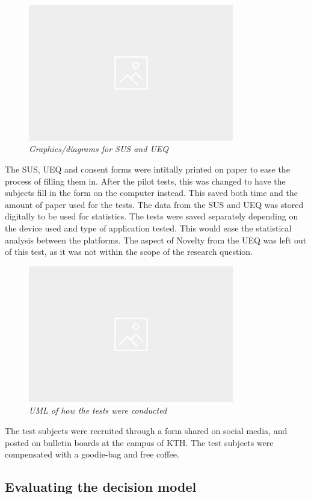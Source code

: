 \begin{figure}[ht!]
	\centering 
    \includegraphics[width=0.8\textwidth]{img/placeholder.png}
	\hfill
	\caption{\textit{ Graphics/diagrams for SUS and UEQ }}
\end{figure}

The SUS, UEQ and consent forms were intitally printed on paper to ease the process of filling them in. After the pilot tests, this was changed to have the subjects fill in the form on the computer instead. This saved both time and the amount of paper used for the tests. The data from the SUS and UEQ was stored digitally to be used for statistics. The tests were saved separately depending on the device used and type of application tested. This would ease the statistical analysis between the platforms. The aspect of Novelty from the UEQ was left out of this test, as it was not within the scope of the research question.

\begin{figure}[ht!]
	\centering 
    \includegraphics[width=0.8\textwidth]{img/placeholder.png}
	\hfill
	\caption{\textit{ UML of how the tests were conducted }}
\end{figure}

The test subjects were recruited through a form shared on social media, and posted on bulletin boards at the campus of KTH. The test subjects were compensated with a goodie-bag and free coffee. 

\subsection{Evaluating the decision model}
